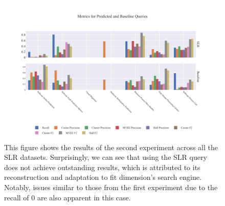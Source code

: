 \documentclass[%
  a4paper,fontsize=11pt,abstract=on,%
  oneside,BCOR=19mm,%
]{scrreprt}
\begin{document}
\begin{figure}
	\centering	
	\includegraphics[scale=0.7]{pics/all-metrics-2.pdf}
	\caption[Evaluation: Experiment 2]{This figure shows the results of the second experiment across all the SLR datasets. Surprisingly, we can see that using the SLR query does not achieve outstanding results, which is attributed to its reconstruction and adaptation to fit dimension's search engine. Notably, issues similar to those from the first experiment due to the recall of 0 are also apparent in this case.}\label{fig:all-metrics-2}
\end{figure}


\printbibliography


\end{document}
